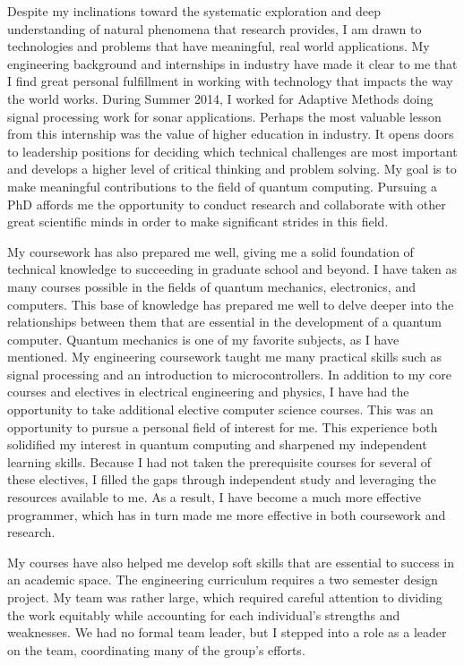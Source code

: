 {    Despite my inclinations toward the systematic exploration and deep
    understanding of natural phenomena that research provides, I am drawn to
    technologies and problems that have meaningful, real world applications. My
    engineering background and internships in industry have made it clear to me
    that I find great personal fulfillment in working with technology that
    impacts the way the world works. During Summer 2014, I worked for Adaptive
    Methods doing signal processing work for sonar applications. Perhaps the
    most valuable lesson from this internship was the value of higher education
    in industry. It opens doors to leadership positions for deciding which
    technical challenges are most important and develops a higher level of
    critical thinking and problem solving. My goal is to make meaningful
    contributions to the field of quantum computing. Pursuing a PhD affords me
    the opportunity to conduct research and collaborate with other great
    scientific minds in order to make significant strides in this field.

    My coursework has also prepared me well, giving me a solid foundation of
    technical knowledge to succeeding in graduate school and beyond. I have
    taken as many courses possible in the fields of quantum mechanics,
    electronics, and computers.  This base of knowledge has prepared me well to
    delve deeper into the relationships between them that are essential in the
    development of a quantum computer.  Quantum mechanics is one of my favorite
    subjects, as I have mentioned. My engineering coursework taught me many
    practical skills such as signal processing and an introduction to
    microcontrollers.  In addition to my core courses and electives in
    electrical engineering and physics, I have had the opportunity to take
    additional elective computer science courses. This was an opportunity to
    pursue a personal field of interest for me.  This experience both
    solidified my interest in quantum computing and sharpened my independent
    learning skills. Because I had not taken the prerequisite courses for
    several of these electives, I filled the gaps through independent study and
    leveraging the resources available to me. As a result, I have become a much
    more effective programmer, which has in turn made me more effective in both
    coursework and research.

    My courses have also helped me develop soft skills that are essential to
    success in an academic space. The engineering curriculum requires a two
    semester design project.  My team was rather large, which required careful
    attention to dividing the work equitably while accounting for each
    individual's strengths and weaknesses.  We had no formal team leader, but I
    stepped into a role as a leader on the team, coordinating many of the
    group's efforts.

}
